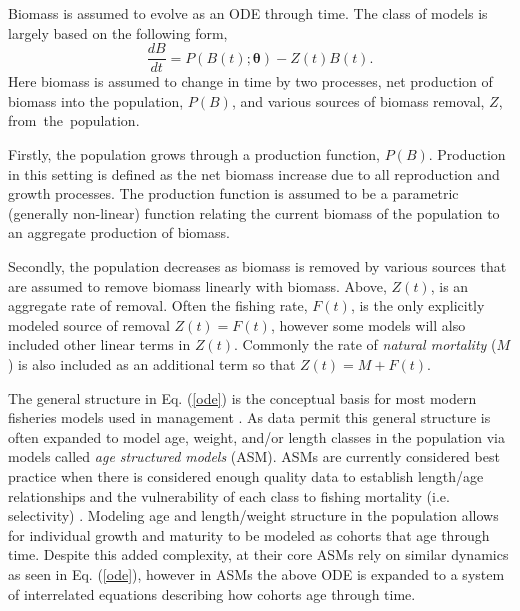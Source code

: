 \documentclass[12pt]{ucscthesis}
\begin{document}
% 
Biomass is assumed to evolve as an ODE through time. 
The class of models is largely based on the following form,
%
\begin{equation}
\frac{dB}{dt} = P(B(t); \bm{\theta}) - Z(t)B(t). \label{ode}
\end{equation}
Here biomass is assumed to change in time by two processes, net production of
biomass into the population, $P(B)$, and various sources of biomass removal, 
$Z$, \mbox{from the population.}

Firstly, the population grows through a production function, $P(B)$. Production
in this setting is defined as the net biomass increase due to all reproduction
and growth processes.
The production function is assumed to be a parametric (generally non-linear) 
function relating the current biomass of the population to an aggregate 
production of biomass.

%
Secondly, the population decreases as biomass is removed by various sources 
that are assumed to remove biomass linearly with biomass. Above, $Z(t)$, is 
an aggregate rate of removal. Often the fishing rate, $F(t)$, is the only 
explicitly modeled source of removal $Z(t)=F(t)$, however some models will 
also included other linear terms in $Z(t)$. Commonly the rate of {\it natural 
mortality} ($M$) is also included as an additional term so that $Z(t)=M+F(t)$.

%

%
The general structure in Eq. (\ref{ode}) is the conceptual basis for most 
modern fisheries models used in management \cite{hilborn_quantitative_1992, methot_stock_2013, winker_jabba_2018}. 
As data permit this general structure is often expanded to model age, weight, 
and/or length classes \cite{schnute_general_1987, fournier_length-based_1987} 
in the population via models called {\it age structured models} (ASM). ASMs 
are currently considered best practice when there is %
considered enough quality data to establish length/age relationships and 
the vulnerability of each class to fishing mortality (i.e. selectivity)
\cite{maunder_review_2013, cope_stock_2023}. 
Modeling age and length/weight structure in the population allows for 
individual growth and maturity to be modeled as cohorts that age through time. 
Despite this added complexity, at their core ASMs rely on similar dynamics as 
seen in Eq. (\ref{ode}), however in ASMs the above ODE is expanded to a system 
of interrelated equations describing how cohorts age through time. %
\end{document}
